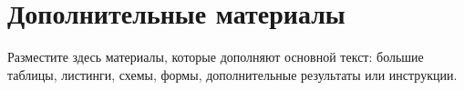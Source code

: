 \chapter{Дополнительные материалы}

Разместите здесь материалы, которые дополняют основной текст: большие таблицы, листинги, схемы, формы, дополнительные результаты или инструкции.
